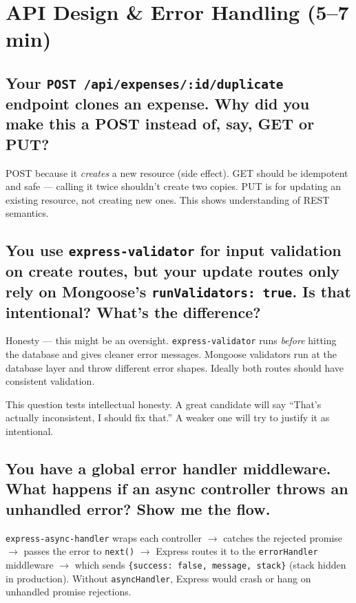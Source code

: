 \documentclass[12pt, a4paper]{article}
\begin{document}
\section{API Design \& Error Handling \textnormal{\textcolor{slatelight}{(5--7 min)}}}

\subsection{Your \texttt{POST /api/expenses/:id/duplicate} endpoint clones an expense. Why did you make this a POST instead of, say, GET or PUT?}

\begin{listenfor}
POST because it \emph{creates} a new resource (side effect). GET should be idempotent and safe — calling it twice shouldn't create two copies. PUT is for updating an existing resource, not creating new ones. This shows understanding of REST semantics.
\end{listenfor}

\subsection{You use \texttt{express-validator} for input validation on create routes, but your update routes only rely on Mongoose's \texttt{runValidators: true}. Is that intentional? What's the difference?}

\begin{listenfor}
Honesty — this might be an oversight. \texttt{express-validator} runs \emph{before} hitting the database and gives cleaner error messages. Mongoose validators run at the database layer and throw different error shapes. Ideally both routes should have consistent validation.
\end{listenfor}

\begin{tipbox}
This question tests intellectual honesty. A great candidate will say ``That's actually inconsistent, I should fix that.'' A weaker one will try to justify it as intentional.
\end{tipbox}

\subsection{You have a global error handler middleware. What happens if an async controller throws an unhandled error? Show me the flow.}

\begin{listenfor}
\texttt{express-async-handler} wraps each controller $\rightarrow$ catches the rejected promise $\rightarrow$ passes the error to \texttt{next()} $\rightarrow$ Express routes it to the \texttt{errorHandler} middleware $\rightarrow$ which sends \texttt{\{success: false, message, stack\}} (stack hidden in production). Without \texttt{asyncHandler}, Express would crash or hang on unhandled promise rejections.
\end{listenfor}
\end{document}
